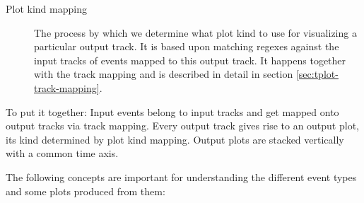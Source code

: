 \documentclass{article}
\begin{document}
\begin{description}
\item[Plot kind mapping] The process by which we determine what plot kind to use for visualizing a particular output track. It is based upon matching regexes against the input tracks of events mapped to this output track. It happens together with the track mapping and is described in detail in section \ref{sec:tplot-track-mapping}.
\end{description}

To put it together: Input events belong to input tracks and get mapped onto output tracks via track mapping. Every output track gives rise to an output plot, its kind determined by plot kind mapping. Output plots are stacked vertically with a common time axis.

The following concepts are important for understanding the different event types and some plots produced from them:
\end{document}
